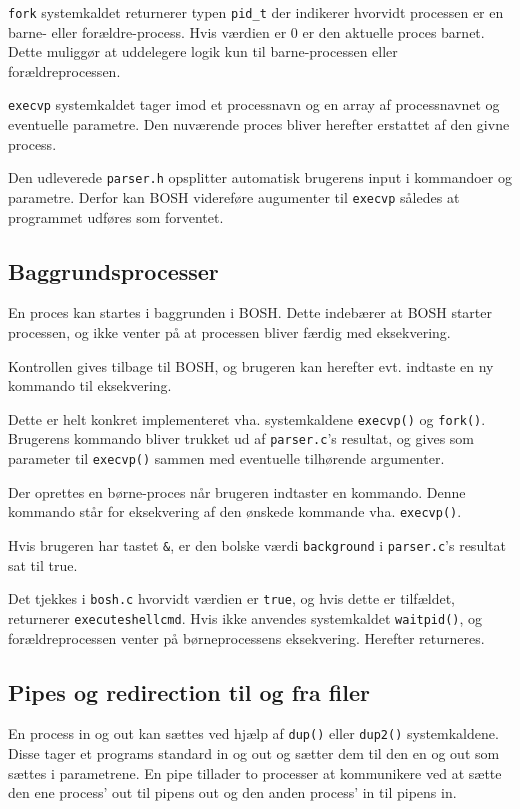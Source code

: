 \texttt{fork} systemkaldet returnerer typen \texttt{pid\_t} der indikerer hvorvidt processen er en barne- eller forældre-process. Hvis værdien er 0 er den aktuelle proces barnet. Dette muliggør at uddelegere logik kun til barne-processen eller forældreprocessen.

\texttt{execvp} systemkaldet tager imod et processnavn og en array af processnavnet og eventuelle parametre. Den nuværende proces bliver herefter erstattet af den givne process.

Den udleverede \verb+parser.h+ opsplitter automatisk brugerens input i kommandoer og parametre. Derfor kan BOSH videreføre augumenter til \verb+execvp+ således at programmet udføres som forventet.
\subsection{Baggrundsprocesser}
En proces kan startes i baggrunden i BOSH. Dette indebærer at BOSH starter processen, og ikke venter på at processen bliver færdig med eksekvering. 

Kontrollen gives tilbage til BOSH, og brugeren kan herefter evt. indtaste en ny kommando til eksekvering. 

Dette er helt konkret implementeret vha. systemkaldene \verb+execvp()+ og \verb+fork()+. Brugerens kommando bliver trukket ud af \verb+parser.c+'s resultat, og gives som parameter til \verb+execvp()+ sammen med eventuelle tilhørende argumenter. 

Der oprettes en børne-proces når brugeren indtaster en kommando. Denne kommando står for eksekvering af den ønskede kommande vha. \verb+execvp()+. 

Hvis brugeren har tastet \verb+&+, er den bolske værdi \verb+background+ i \verb+parser.c+'s resultat sat til true. 

Det tjekkes i \verb+bosh.c+ hvorvidt værdien er \verb+true+, og hvis dette er tilfældet, returnerer \verb+executeshellcmd+. Hvis ikke anvendes systemkaldet \verb+waitpid()+, og forældreprocessen venter på børneprocessens eksekvering. Herefter returneres.
\subsection{Pipes og redirection til og fra filer}
En process in og out kan sættes ved hjælp af \verb+dup()+ eller \verb+dup2()+ systemkaldene. Disse tager et programs standard in og out og sætter dem til den en og out som sættes i parametrene. En pipe tillader to processer at kommunikere ved at sætte den ene process' out til pipens out og den anden process' in til pipens in.

